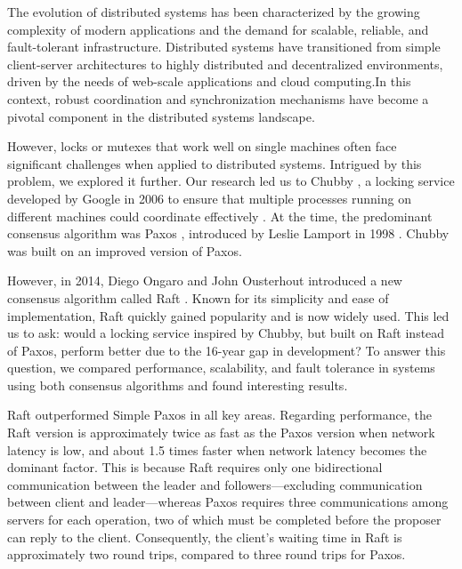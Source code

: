 \documentclass[11pt,a4paper]{article}
\begin{document}
The evolution of distributed systems has been characterized by the growing complexity of modern applications and the demand for scalable, reliable, and fault-tolerant infrastructure. Distributed systems have transitioned from simple client-server architectures to highly distributed and decentralized environments, driven by the needs of web-scale applications and cloud computing.In this context, robust coordination and synchronization mechanisms have become a pivotal component in the distributed systems landscape.

However, locks or mutexes that work well on single machines often face significant challenges when applied to distributed systems.
Intrigued by this problem, we explored it further. Our research led us to Chubby \cite{burrows2006chubby}, a locking service developed by Google in 2006 to ensure that multiple processes running on different machines could coordinate effectively . At the time, the predominant consensus algorithm was Paxos \cite{lamport1998paxos,lamport2001paxos}, introduced by Leslie Lamport in 1998 . Chubby was built on an improved version of Paxos.

However, in 2014, Diego Ongaro and John Ousterhout introduced a new consensus algorithm called Raft \cite{ongaro2014raft}. Known for its simplicity and ease of implementation, Raft quickly gained popularity and is now widely used. This led us to ask: would a locking service inspired by Chubby, but built on Raft instead of Paxos, perform better due to the 16-year gap in development? To answer this question, we compared performance, scalability, and fault tolerance in systems using both consensus algorithms and found interesting results.

Raft outperformed Simple Paxos in all key areas. Regarding performance, the Raft version is approximately twice as fast as the Paxos version when network latency is low, and about 1.5 times faster when network latency becomes the dominant factor. This is because Raft requires only one bidirectional communication between the leader and followers—excluding communication between client and leader—whereas Paxos requires three communications among servers for each operation, two of which must be completed before the proposer can reply to the client. Consequently, the client's waiting time in Raft is approximately two round trips, compared to three round trips for Paxos.
\end{document}
